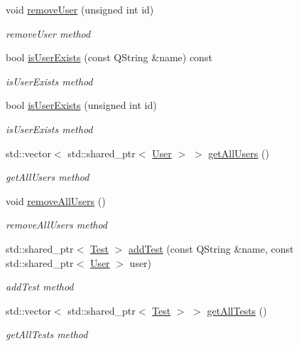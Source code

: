 \begin{DoxyCompactItemize}
void \hyperlink{class_db_manager_ae9a11e4d2d53c2e4f63a835c43f2bab8}{remove\+User} (unsigned int id)
\begin{DoxyCompactList}\small\item\em remove\+User method \end{DoxyCompactList}\item 
bool \hyperlink{class_db_manager_aae0009d480007ab6bcd7cab246d1f6d8}{is\+User\+Exists} (const Q\+String \&name) const
\begin{DoxyCompactList}\small\item\em is\+User\+Exists method \end{DoxyCompactList}\item 
bool \hyperlink{class_db_manager_a19a6af3a00775430dd6083db3e79efdb}{is\+User\+Exists} (unsigned int id)
\begin{DoxyCompactList}\small\item\em is\+User\+Exists method \end{DoxyCompactList}\item 
std\+::vector$<$ std\+::shared\+\_\+ptr$<$ \hyperlink{class_user}{User} $>$ $>$ \hyperlink{class_db_manager_a44c0415410d7bd27c7b0f1c0545b7a9c}{get\+All\+Users} ()
\begin{DoxyCompactList}\small\item\em get\+All\+Users method \end{DoxyCompactList}\item 
void \hyperlink{class_db_manager_ae88db6e7e58af05cb6da243fa1898398}{remove\+All\+Users} ()
\begin{DoxyCompactList}\small\item\em remove\+All\+Users method \end{DoxyCompactList}\item 
std\+::shared\+\_\+ptr$<$ \hyperlink{class_test}{Test} $>$ \hyperlink{class_db_manager_a2e98860e52ef75cb949d244bded4c843}{add\+Test} (const Q\+String \&name, const std\+::shared\+\_\+ptr$<$ \hyperlink{class_user}{User} $>$ user)
\begin{DoxyCompactList}\small\item\em add\+Test method \end{DoxyCompactList}\item 
std\+::vector$<$ std\+::shared\+\_\+ptr$<$ \hyperlink{class_test}{Test} $>$ $>$ \hyperlink{class_db_manager_a8f581529cc754936b6a218723bc29d03}{get\+All\+Tests} ()
\begin{DoxyCompactList}\small\item\em get\+All\+Tests method \end{DoxyCompactList}\item 

\end{DoxyCompactItemize}
